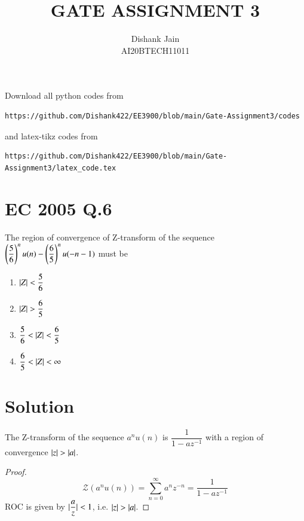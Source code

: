 \documentclass[journal,12pt,twocolumn]{IEEEtran}
\begin{document}
     \def\centbox#1{\makebox[0in]{#1}}
     \def\topbox#1{\raisebox{-\baselineskip}[0in][0in]{#1}}
     \def\midbox#1{\raisebox{-0.5\baselineskip}[0in][0in]{#1}}
\vspace{3cm}
\title{GATE ASSIGNMENT 3}
\author{Dishank Jain \\ AI20BTECH11011}
\maketitle
\newpage
\bigskip
\renewcommand{\thefigure}{\theenumi}
\renewcommand{\thetable}{\theenumi}
Download all python codes from 
%
\begin{lstlisting}
https://github.com/Dishank422/EE3900/blob/main/Gate-Assignment3/codes
\end{lstlisting}
%
and latex-tikz codes from
%
\begin{lstlisting}
https://github.com/Dishank422/EE3900/blob/main/Gate-Assignment3/latex_code.tex
\end{lstlisting}
%
\section{EC 2005 Q.6}
The region of convergence of Z-transform of the sequence $\left(\dfrac{5}{6}\right)^nu(n) -\left(\dfrac{6}{5}\right)^nu(-n-1)$ must be
\begin{enumerate}[label = (\Alph*)]
\setlength\itemsep{0.7em}
    \item $\vert Z\vert < \dfrac{5}{6}$
    \item $\vert Z\vert > \dfrac{6}{5}$
    \item $\dfrac{5}{6} < \vert Z\vert < \dfrac{6}{5}$
    \item $\dfrac{6}{5} < \vert Z\vert < \infty$
\end{enumerate}

\section{Solution}
\begin{lemma}
The Z-transform of the sequence $a^nu(n)$ is $\dfrac{1}{1-az^{-1}}$ with a region of convergence $\vert z\vert > \vert a\vert$.
\end{lemma}
\begin{proof}
\begin{equation}
    \mathcal{Z}(a^nu(n)) = \sum_{n=0}^{\infty}a^nz^{-n} = \dfrac{1}{1-az^{-1}}
\end{equation}
ROC is given by $\vert\dfrac{a}{z}\vert < 1$, i.e. $\vert z\vert > \vert a\vert$.
\end{proof}
\end{document}
